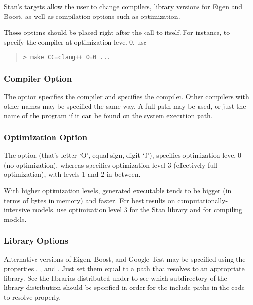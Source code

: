 Stan's  targets allow the user to change compilers,
library versions for Eigen and Boost, as well as compilation options
such as optimization.

These options should be placed right after the call to 
itself.  For instance, to specify the  compiler at
optimization level 0, use
%
\begin{quote}
\begin{Verbatim}[fontshape=sl]
> make CC=clang++ O=0 ...
\end{Verbatim}
\end{quote}


\subsubsection{Compiler Option}

The option  specifies the  compiler and
 specifies the  compiler.  Other
compilers with other names may be specified the same way.  A full path
may be used, or just the name of the program if it can be found on the
system execution path.  

\subsubsection{Optimization Option}

The option  (that's letter `O', equal sign, digit `0'),
specifies optimization level 0 (no optimization), whereas 
specifies optimization level 3 (effectively full optimization), with
levels 1 and 2 in between.

With higher optimization levels, generated executable tends to be bigger
(in terms of bytes in memory) and faster.  For best results on
computationally-intensive models, use optimization level 3 for the
Stan library and for compiling models.

\subsubsection{Library Options}

Alternative versions of Eigen, Boost, and Google Test may be specified
using the properties , , and .
Just set them equal to a path that resolves to an appropriate library.
See the libraries distributed under  to see which
subdirectory of the library distribution should be specified in order
for the include paths in the \Cpp code to resolve properly.


